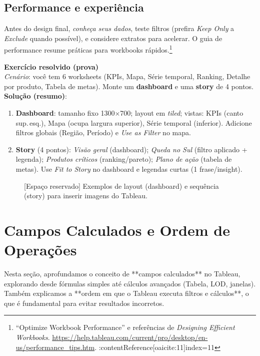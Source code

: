 \subsection{Performance e experiência}
Antes do design final, \textit{conheça seus dados}, teste filtros (prefira \textit{Keep Only} a \textit{Exclude} quando possível), e considere extratos para acelerar. O guia de performance resume práticas para workbooks rápidos.\footnote{``Optimize Workbook Performance'' e referências de \textit{Designing Efficient Workbooks}. \url{https://help.tableau.com/current/pro/desktop/en-us/performance_tips.htm}. :contentReference[oaicite:11]{index=11}}

\begin{SolvedBox}
\textbf{Exercício resolvido (prova)}\\[-2pt]
\emph{Cenário}: você tem 6 worksheets (KPIs, Mapa, Série temporal, Ranking, Detalhe por produto, Tabela de metas). Monte um \textbf{dashboard} e uma \textbf{story} de 4 pontos.\\
\textbf{Solução (resumo)}:
\begin{enumerate}[leftmargin=*]
  \item \textbf{Dashboard}: tamanho fixo 1300$\times$700; layout em \emph{tiled}; vistas: KPIs (canto sup.\,esq.), Mapa (ocupa largura superior), Série temporal (inferior). Adicione filtros globais (Região, Período) e \emph{Use as Filter} no mapa. 
  \item \textbf{Story} (4 pontos): \emph{Visão geral} (dashboard); \emph{Queda no Sul} (filtro aplicado + legenda); \emph{Produtos críticos} (ranking/pareto); \emph{Plano de ação} (tabela de metas). Use \emph{Fit to Story} no dashboard e legendas curtas (1 frase/insight).
\end{enumerate}
\end{SolvedBox}

\begin{figure}[H]
\centering
\fbox{\rule{0pt}{110pt}\rule{0.92\linewidth}{0pt}}
\caption{[Espaço reservado] Exemplos de layout (dashboard) e sequência (story) para inserir imagens do Tableau.}
\end{figure}





\section{Campos Calculados e Ordem de Operações}

Nesta seção, aprofundamos o conceito de **campos calculados** no Tableau, explorando desde fórmulas simples até cálculos avançados (Tabela, LOD, janelas). Também explicamos a **ordem em que o Tableau executa filtros e cálculos**, o que é fundamental para evitar resultados incorretos.

